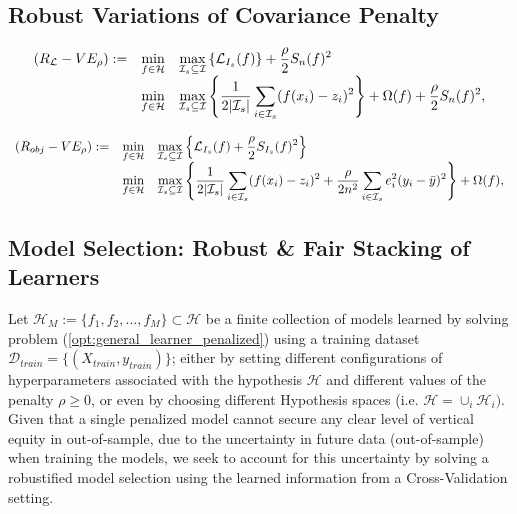 \documentclass[11pt]{article}
\theoremstyle{plain}
\theoremstyle{definition}
\newcommand{\1}{\mathbf{1}}
\newcommand{\D}{\mathcal{D}}
\newcommand{\I}{\mathcal{I}}
\renewcommand{\L}{\mathcal{L}}
\renewcommand{\H}{\mathcal{H}}
\begin{document}
{\subsection{Robust Variations of Covariance Penalty}

\begin{align}
    {\everymath{\displaystyle}
    \begin{array}{cclcccc}
    (R_{\L}-VE_{\rho}):= &  \min_{f\in \H}   & \max_{\I_s \subseteq \I}\left\{ \L_{I_s}(f)\right\} + \frac{\rho}{2} S_n(f)^2 \\
    & \min_{f\in \H}   & \max_{\I_s \subseteq \I}\left\{ \frac{1}{2|\I_s|}\sum_{i \in \I_s}(f(x_i)-z_i)^2\right\} + \Omega(f) + \frac{\rho}{2} S_n(f)^2 ,
    \end{array}
    }
    \label{opt:robust_model_1}
\end{align}

\begin{align}
    {\everymath{\displaystyle}
    \begin{array}{cclcccc}
    (R_{obj}-VE_{\rho}):= &  \min_{f\in \H}   & \max_{\I_s \subseteq \I}\left\{ \L_{I_s}(f) + \frac{\rho}{2} S_{I_s}(f)^2\right\} \\
    & \min_{f\in \H}   & \max_{\I_s \subseteq \I}\left\{ \frac{1}{2|\I_s|}\sum_{i \in \I_s}(f(x_i)-z_i)^2 + \frac{\rho}{2n^2} \sum_{i \in \I_s} e_i^2(y_i - \Bar{y})^2 \right\} + \Omega(f)  ,
    \end{array}
    }
    \label{opt:robust_model_2}
\end{align}


\subsection{Model Selection: Robust \& Fair Stacking of Learners }

Let   $\H_{M}:=\{f_{1}, f_2 ,\ldots, f_M\} \subset \H$ be a finite collection of models learned by solving problem (\ref{opt:general_learner_penalized}) using a training dataset $\D_{train}=\{(X_{train}, y_{train})\}$; either by setting different configurations of hyperparameters associated with the hypothesis $\H$ and different values of the penalty $\rho\geq 0$, or even by choosing different Hypothesis spaces (i.e. $\H = \cup_i\H_i)$. Given that a single penalized model cannot secure any clear level of vertical equity in out-of-sample, due to the uncertainty in future data (out-of-sample) when training the models, we seek to account for this uncertainty by solving a robustified model selection using the learned information from a Cross-Validation setting. 

}
\end{document}
